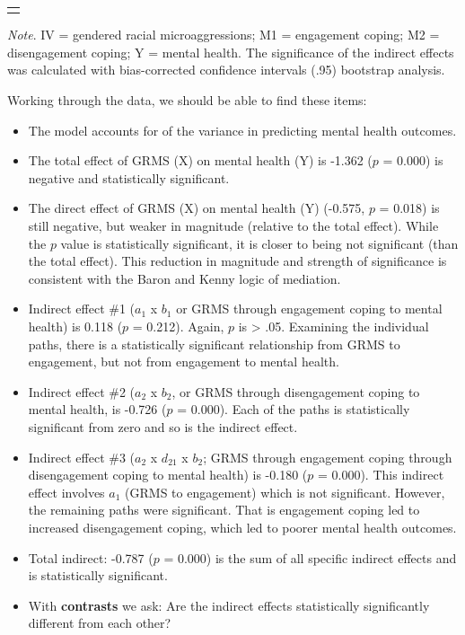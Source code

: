 \documentclass[
  11pt,
]{book}
\providecommand{\tightlist}{%
  \setlength{\itemsep}{0pt}\setlength{\parskip}{0pt}}
\begin{document}
\begin{longtable}[]{@{}
  >{\raggedright\arraybackslash}p{}@{}}
\toprule\noalign{}
\endhead
\bottomrule\noalign{}
\endlastfoot
\end{longtable}

\emph{Note}. IV = gendered racial microaggressions; M1 = engagement coping; M2 = disengagement coping; Y = mental health. The significance of the indirect effects was calculated with bias-corrected confidence intervals (.95) bootstrap analysis.

Working through the data, we should be able to find these items:

\begin{itemize}
\tightlist
\item
  The model accounts for of the variance in predicting mental health outcomes.
\item
  The total effect of GRMS (X) on mental health (Y) is -1.362 (\(p\) = 0.000) is negative and statistically significant.
\item
  The direct effect of GRMS (X) on mental health (Y) (-0.575, \(p\) = 0.018) is still negative, but weaker in magnitude (relative to the total effect). While the \(p\) value is statistically significant, it is closer to being not significant (than the total effect). This reduction in magnitude and strength of significance is consistent with the Baron and Kenny \citeyearpar{baron_moderator-mediator_1986} logic of mediation.
\item
  Indirect effect \#1 (\(a_{1}\) x \(b_{1}\) or GRMS through engagement coping to mental health) is 0.118 (\(p\) = 0.212). Again, \(p\) is \textgreater{} .05. Examining the individual paths, there is a statistically significant relationship from GRMS to engagement, but not from engagement to mental health.
\item
  Indirect effect \#2 (\(a_{2}\) x \(b_{2}\), or GRMS through disengagement coping to mental health, is -0.726 (\(p\) = 0.000). Each of the paths is statistically significant from zero and so is the indirect effect.
\item
  Indirect effect \#3 (\(a_{2}\) x \(d_{21}\) x \(b_{2}\); GRMS through engagement coping through disengagement coping to mental health) is -0.180 (\(p\) = 0.000). This indirect effect involves \(a_{1}\) (GRMS to engagement) which is not significant. However, the remaining paths were significant. That is engagement coping led to increased disengagement coping, which led to poorer mental health outcomes.
\item
  Total indirect: -0.787 (\(p\) = 0.000) is the sum of all specific indirect effects and is statistically significant.
\item
  With \textbf{contrasts} we ask: Are the indirect effects statistically significantly different from each other?


\end{itemize}
\end{document}
